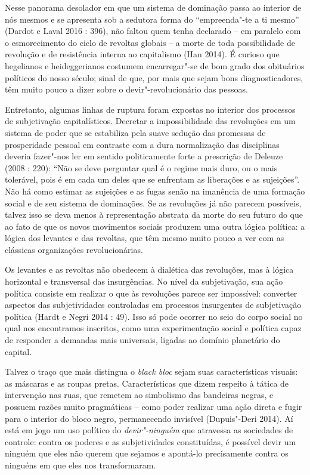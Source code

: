Nesse panorama desolador em que um sistema de dominação passa ao
interior de nós mesmos e se apresenta sob a sedutora forma do
``empreenda"-te a ti mesmo'' (Dardot e Laval 2016 : 396), não faltou quem
tenha declarado -- em paralelo com o esmorecimento do ciclo de revoltas
globais -- a morte de toda possibilidade de revolução e de resistência
interna ao capitalismo (Han 2014). É curioso que hegelianos e
heideggerianos costumem encarregar"-se de bom grado dos obituários
políticos do nosso século; sinal de que, por mais que sejam bons
diagnosticadores, têm muito pouco a dizer sobre o devir"-revolucionário
das pessoas.

Entretanto, algumas linhas de ruptura foram expostas no interior dos
processos de subjetivação capitalísticos. Decretar a impossibilidade das
revoluções em um sistema de poder que se estabiliza pela suave sedução
das promessas de prosperidade pessoal em contraste com a dura
normalização das disciplinas deveria fazer"-nos ler em sentido
politicamente forte a prescrição de Deleuze (2008 : 220): ``Não se deve
perguntar qual é o regime mais duro, ou o mais tolerável, pois é em cada
um deles que se enfrentam as liberações e as sujeições''. Não há como
estimar as sujeições e as fugas senão na imanência de uma formação
social e de seu sistema de dominações. Se as revoluções já não parecem
possíveis, talvez isso se deva menos à representação abstrata da morte
do seu futuro do que ao fato de que os novos movimentos sociais produzem
uma outra lógica política: a lógica dos levantes e das revoltas, que têm
mesmo muito pouco a ver com as clássicas organizações revolucionárias.

Os levantes e as revoltas não obedecem à dialética das revoluções, mas à
lógica horizontal e transversal das insurgências. No nível da
subjetivação, sua ação política consiste em realizar o que às revoluções
parece ser impossível: converter aspectos das subjetividades controladas
em processos insurgentes de subjetivação política (Hardt e Negri 2014 :
49). Isso só pode ocorrer no seio do corpo social no qual nos
encontramos inscritos, como uma experimentação social e política capaz
de responder a demandas mais universais, ligadas ao domínio planetário
do capital.

Talvez o traço que mais distingua o \emph{black bloc} sejam suas
características visuais: as máscaras e as roupas pretas. Características
que dizem respeito à tática de intervenção nas ruas, que remetem ao
simbolismo das bandeiras negras, e possuem razões muito pragmáticas --
como poder realizar uma ação direta e fugir para o interior do bloco
negro, permanecendo invisível (Dupuis"-Deri 2014). Aí está em jogo um uso
político do \emph{devir"-ninguém }que atravessa as sociedades de
controle: contra os poderes e as subjetividades constituídas, é possível
devir um ninguém que eles não querem que sejamos e apontá-lo
precisamente contra os ninguéns em que eles nos transformaram.

